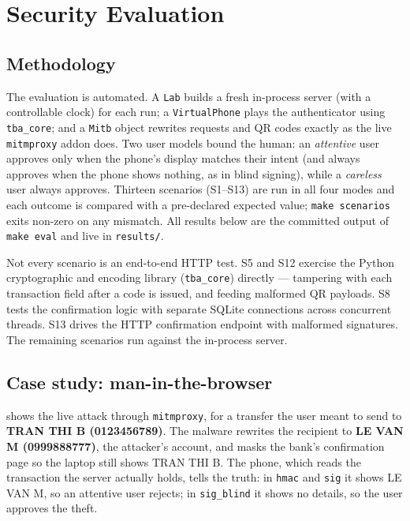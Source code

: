 \section{Security Evaluation}\label{sec:eval}

\subsection{Methodology}
The evaluation is automated. A \texttt{Lab} builds a fresh in-process server
(with a controllable clock) for each run; a \texttt{VirtualPhone} plays the
authenticator using \texttt{tba\_core}; and a \texttt{Mitb} object rewrites
requests and QR codes exactly as the live \texttt{mitmproxy} addon does. Two user
models bound the human: an \emph{attentive} user approves only when the phone's
display matches their intent (and always approves when the phone shows nothing,
as in blind signing), while a \emph{careless} user always approves. Thirteen
scenarios (S1--S13) are run in all four modes and each outcome is compared with a
pre-declared expected value; \texttt{make scenarios} exits non-zero on any
mismatch. All results below are the committed output of \texttt{make eval} and
live in \texttt{results/}.

Not every scenario is an end-to-end HTTP test. S5 and S12 exercise the Python
cryptographic and encoding library (\texttt{tba\_core}) directly --- tampering
with each transaction field after a code is issued, and feeding malformed QR
payloads. S8 tests the confirmation logic with separate SQLite connections across
concurrent threads. S13 drives the HTTP confirmation endpoint with malformed
signatures. The remaining scenarios run against the in-process server.

\subsection{Case study: man-in-the-browser}
 shows the live attack through \texttt{mitmproxy}, for a transfer
the user meant to send to \textbf{TRAN THI B (0123456789)}. The malware rewrites
the recipient to \textbf{LE VAN M (0999888777)}, the attacker's account, and
masks the bank's confirmation page so the laptop still shows TRAN THI B. The
phone, which reads the transaction the server actually holds, tells the truth: in
\texttt{hmac} and \texttt{sig} it shows LE VAN M, so an attentive user rejects; in
\texttt{sig\_blind} it shows no details, so the user approves the theft.

